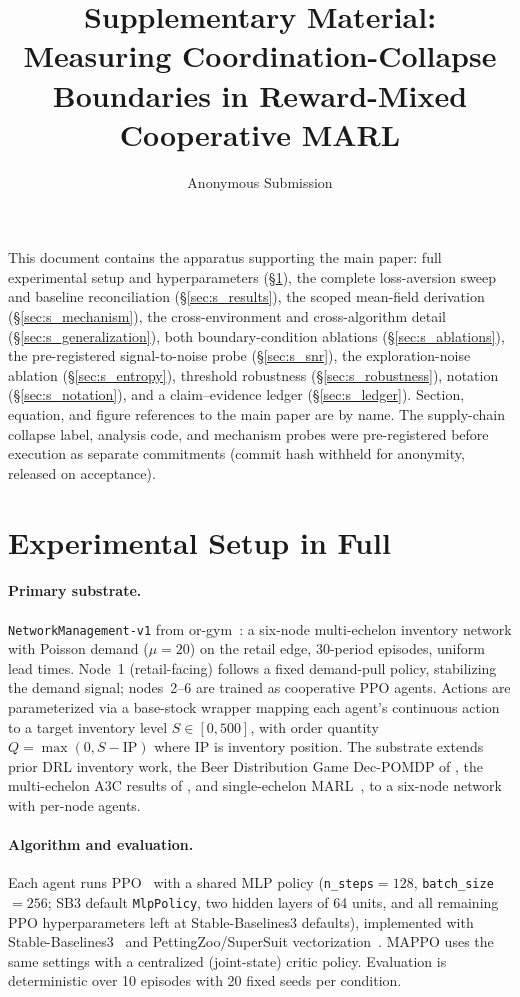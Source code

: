 \documentclass[letterpaper]{article} %
\title{Supplementary Material:\\Measuring Coordination-Collapse Boundaries in Reward-Mixed Cooperative MARL}
\author{
  Anonymous Submission
}
\theoremstyle{plain}
\begin{document}
\maketitle

\noindent This document contains the apparatus supporting the main paper: full experimental
setup and hyperparameters (\S\ref{sec:s_setup}), the complete loss-aversion sweep and
baseline reconciliation (\S\ref{sec:s_results}), the scoped mean-field derivation
(\S\ref{sec:s_mechanism}), the cross-environment and cross-algorithm detail
(\S\ref{sec:s_generalization}), both boundary-condition ablations (\S\ref{sec:s_ablations}),
the pre-registered signal-to-noise probe (\S\ref{sec:s_snr}), the exploration-noise ablation
(\S\ref{sec:s_entropy}), threshold robustness (\S\ref{sec:s_robustness}), notation
(\S\ref{sec:s_notation}), and a claim--evidence ledger (\S\ref{sec:s_ledger}). Section,
equation, and figure references to the main paper are by name. The supply-chain collapse label,
analysis code, and mechanism probes were pre-registered before execution as separate commitments
(commit hash withheld for anonymity, released on acceptance).

\section{Experimental Setup in Full}
\label{sec:s_setup}

\paragraph{Primary substrate.}
\texttt{NetworkManagement-v1} from or-gym~\citep{hubbs2020orgym}: a six-node multi-echelon
inventory network with Poisson demand ($\mu{=}20$) on the retail edge, 30-period episodes,
uniform lead times. Node~1 (retail-facing) follows a fixed demand-pull policy, stabilizing
the demand signal; nodes~2--6 are trained as cooperative PPO agents. Actions are
parameterized via a base-stock wrapper mapping each agent's continuous action to a target
inventory level $S\in[0,500]$, with order quantity $Q=\max(0,S-\mathrm{IP})$ where
$\mathrm{IP}$ is inventory position. The substrate extends prior DRL inventory work, the
Beer Distribution Game Dec-POMDP of \citet{oroojlooyjadid2022}, the multi-echelon A3C results
of \citet{gijsbrechts2022}, and single-echelon MARL~\citep{marlim2023}, to a six-node
network with per-node agents.

\paragraph{Algorithm and evaluation.}
Each agent runs PPO~\citep{schulman2017ppo} with a shared MLP policy
(\texttt{n\_steps}${=}128$, \texttt{batch\_size}${=}256$; SB3 default \texttt{MlpPolicy}, two
hidden layers of 64 units, and all remaining PPO hyperparameters left at Stable-Baselines3
defaults), implemented with Stable-Baselines3~\citep{raffin2021sb3} and PettingZoo/SuperSuit
vectorization~\citep{terry2021pettingzoo,terry2020supersuit}. MAPPO uses the same settings with a
centralized (joint-state) critic policy. Evaluation is deterministic over 10 episodes with 20 fixed
seeds per condition.
\end{document}
